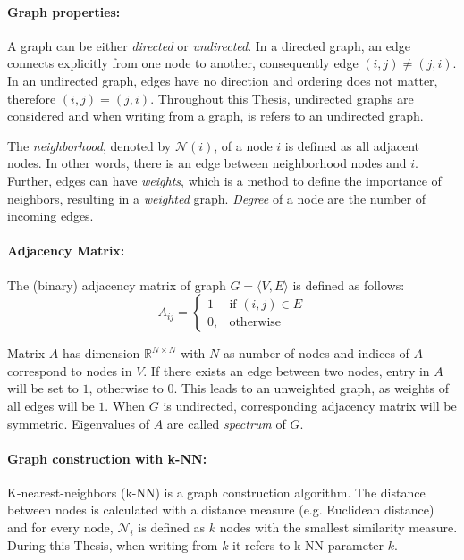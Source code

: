 \paragraph{Graph properties:}
A graph can be either \textit{directed} or \textit{undirected}. 
In a directed graph, an edge connects explicitly from one node to another, consequently edge $(i, j) \neq (j, i)$. 
In an undirected graph, edges have no direction and ordering does not matter, therefore $(i, j) = (j, i)$.
Throughout this Thesis, undirected graphs are considered and when writing from a graph, is refers to an undirected graph.

The \textit{neighborhood}, denoted by $\mathcal{N}(i)$, of a node $i$  is defined as all adjacent nodes.
In other words, there is an edge between neighborhood nodes and $i$. 
Further, edges can have \textit{weights}, which is a method to define the importance of neighbors, resulting in a \textit{weighted} graph.
\textit{Degree} of a node are the number of incoming edges.

\paragraph{Adjacency Matrix:}
The (binary) adjacency matrix of graph $G = \langle V, E \rangle$ is defined as follows:
\begin{equation}
    \label{eg:AdjacencyMatrix}
    A_{ij} =    
    \begin{cases}
        1  & \text{if } (i, j) \in E \\
        0, & \text{otherwise}
    \end{cases}
\end{equation}

Matrix $A$ has dimension $\mathbb{R}^{N \times N}$ with $N$ as number of nodes
and indices of $A$ correspond to nodes in $V$.
If there exists an edge between two nodes, entry in $A$ will be set to $1$, otherwise to $0$.
This leads to an unweighted graph, as weights of all edges will be $1$.
When $G$ is undirected, corresponding adjacency matrix will be symmetric. 
Eigenvalues of $A$ are called \textit{spectrum} of $G$.

\paragraph{Graph construction with k-NN:}
K-nearest-neighbors (k-NN) is a graph construction algorithm. The distance between
nodes is calculated with a distance measure (e.g. Euclidean distance) and 
for every node, $\mathcal{N}_i$ is defined as $k$ nodes with the smallest similarity measure.
During this Thesis, when writing from $k$ it refers to k-NN parameter $k$.

